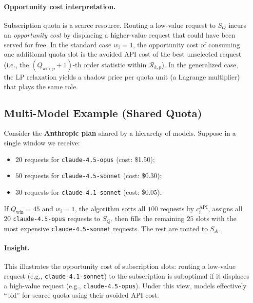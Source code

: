 \documentclass[11pt]{article}
\begin{document}
\paragraph{Opportunity cost interpretation.}
Subscription quota is a scarce resource. Routing a low-value request to \(S_Q\) incurs an \emph{opportunity cost} by displacing a higher-value request that could have been served for free.
In the standard case \(w_i=1\), the opportunity cost of consuming one additional quota slot is the avoided API cost of the best unselected request (i.e., the \((Q_{\text{win},p}+1)\)-th order statistic within \(\mathcal{R}_{k,p}\)).
In the generalized case, the LP relaxation yields a shadow price per quota unit (a Lagrange multiplier) that plays the same role.

\subsection{Multi-Model Example (Shared Quota)}
Consider the \textbf{Anthropic plan} shared by a hierarchy of models. Suppose in a single window we receive:
\begin{itemize}
  \item \(20\) requests for \texttt{claude-4.5-opus} (cost: \$1.50);
  \item \(50\) requests for \texttt{claude-4.5-sonnet} (cost: \$0.30);
  \item \(30\) requests for \texttt{claude-4.1-sonnet} (cost: \$0.05).
\end{itemize}
If \(Q_{\text{win}}=45\) and \(w_i=1\), the algorithm sorts all \(100\) requests by \(c_i^{\text{API}}\), assigns all \(20\) \texttt{claude-4.5-opus} requests to \(S_Q\), then fills the remaining \(25\) slots with the most expensive \texttt{claude-4.5-sonnet} requests. The rest are routed to \(S_A\).

\paragraph{Insight.}
This illustrates the opportunity cost of subscription slots: routing a low-value request (e.g., \texttt{claude-4.1-sonnet}) to the subscription is suboptimal if it displaces a high-value request (e.g., \texttt{claude-4.5-opus}).
Under this view, models effectively ``bid'' for scarce quota using their avoided API cost.
\end{document}
